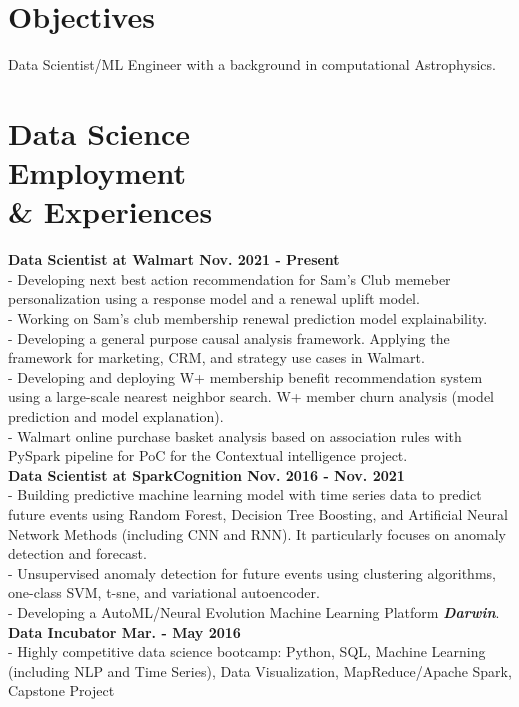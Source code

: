 \documentclass[margin,centered]{res}
\begin{document}
\begin{resume}

\vspace{-0.25cm}
\section{Objectives} Data Scientist/ML Engineer with a background in computational Astrophysics.


\section{Data Science \\ Employment \\ \& Experiences}
{\bf Data Scientist at Walmart Nov. 2021 - Present} \\
- Developing next best action recommendation for Sam's Club memeber personalization using a response model and a renewal uplift model. \\
- Working on Sam's club membership renewal prediction model explainability. \\
- Developing a general purpose causal analysis framework. Applying the framework for marketing, CRM, and strategy use cases in Walmart. \\
- Developing and deploying W+ membership benefit recommendation system using a large-scale nearest neighbor search. W+ member churn analysis (model prediction and model explanation).\\
- Walmart online purchase basket analysis based on association rules with PySpark pipeline for PoC for the Contextual intelligence project.\\
{\bf Data Scientist at SparkCognition Nov. 2016 - Nov. 2021} \\
- Building predictive machine learning model with time series data to predict future events using Random Forest, Decision Tree Boosting, and Artificial Neural Network Methods (including CNN and RNN). It particularly focuses on anomaly detection and forecast.\\
- Unsupervised anomaly detection for future events using clustering algorithms, one-class SVM, t-sne, and variational autoencoder. \\
- Developing a AutoML/Neural Evolution Machine Learning Platform {\bf {\it Darwin}}.\\
{\bf Data Incubator Mar. - May 2016}  \\
- Highly competitive data science bootcamp: Python, SQL, Machine Learning (including NLP and Time Series), Data Visualization, MapReduce/Apache Spark, Capstone Project\\


\end{resume}
\end{document}

